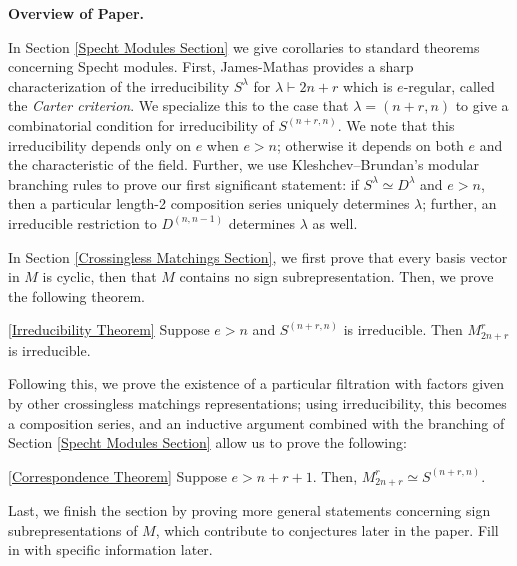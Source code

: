 \documentclass{amsart}
\newcommand{\fakesubsection}[1]{
    \vspace{7pt}
    \noindent \textbf{#1.}
  }
\begin{document}
  \fakesubsection{Overview of Paper}
  
  In Section \ref{Specht Modules Section} we give corollaries to standard theorems concerning Specht modules.
  First, James-Mathas provides a sharp characterization of the irreducibility $S^\lambda$ for $\lambda \vdash 2n + r$ which is $e$-regular, called the \emph{Carter criterion}.\cite{Mathas-book}
  We specialize this to the case that $\lambda = (n+r,n)$ to give a combinatorial condition for irreducibility of $S^{(n+r,n)}$.
  We note that this irreducibility depends only on $e$ when $e > n$;
  otherwise it depends on both $e$ and the characteristic of the field.
  Further, we use Kleshchev--Brundan's modular branching rules to prove our first significant statement: if $S^\lambda \simeq D^\lambda$ and $e > n$, then a particular length-2 composition series uniquely determines $\lambda$;
  further, an irreducible restriction to $D^{(n,n-1)}$ determines $\lambda$ as well.\cite{Kleshchev, Brundan}

  \def\thmcolor{black!60!orange}
  \vspace{5pt}
  In Section \ref{Crossingless Matchings Section}, we first prove that every basis vector in $M$ is cyclic, then that $M$ contains no sign subrepresentation.
  Then, we prove the following theorem.
  \begingroup
  \hypersetup{linkcolor=\thmcolor} %
  \begin{customthm}{\ref{Irreducibility Theorem}}
    Suppose $e > n$ and $S^{(n+r,n)}$ is irreducible.
    Then $M_{2n + r}^r$ is irreducible.
  \end{customthm}
  \endgroup
  Following this, we prove the existence of a particular filtration with factors given by other crossingless matchings representations;
  using irreducibility, this becomes a composition series, and an inductive argument combined with the branching of Section \ref{Specht Modules Section} allow us to prove the following:
  \begingroup
  \hypersetup{linkcolor=\thmcolor}
  \begin{customthm}{\ref{Correspondence Theorem}}
    Suppose $e > n + r + 1$.
    Then, $M_{2n + r}^r \simeq S^{(n+r,n)}$.
  \end{customthm}
  \endgroup
  Last, we finish the section by proving more general statements concerning sign subrepresentations of $M$, which contribute to conjectures later in the paper.{\color{orange} Fill in with specific information later.}
\end{document}
